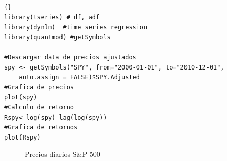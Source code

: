 %			
%			
%	
%	
\begin{lstlisting}[title={‘Código R: Ejemplo 1: S\&P500},basicstyle=\ttfamily]{}
library(tseries) # df, adf
library(dynlm)  #time series regression
library(quantmod) #getSymbols

#Descargar data de precios ajustados
spy <- getSymbols("SPY", from="2000-01-01", to="2010-12-01",
	auto.assign = FALSE)$SPY.Adjusted
#Grafica de precios
plot(spy)
#Calculo de retorno
Rspy<-log(spy)-lag(log(spy))
#Grafica de retornos
plot(Rspy)
\end{lstlisting}
	
	\begin{figure}[H]
		\centering
		\textbf{}\par\medskip
		\caption{Precios diarios S$\&$P 500}\label{fig5_1}
	\end{figure}
	
